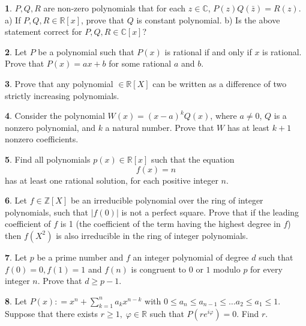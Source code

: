 \documentclass{article}
\theoremstyle{definition}
\newtheorem{p}{}
\begin{document}
\begin{p}
$P,Q,R$ are non-zero polynomials that for each $z\in\mathbb C$, $P(z)Q(\bar z)=R(z)$.
a) If $P,Q,R\in\mathbb R[x]$, prove that $Q$ is constant polynomial.
b) Is the above statement correct for $P,Q,R\in\mathbb C[x]$?
\end{p}



\begin{p}
Let $P$ be a polynomial such that $P(x)$ is rational if and only if $x$ is rational. Prove that $P(x)=ax+b$ for some rational $a$ and $b$.
\end{p}



\begin{p}
Prove that any polynomial $\in \mathbb{R} [X]$ can be written as a difference of two strictly increasing polynomials.
\end{p}



\begin{p}
Consider the polynomial $W(x) = (x - a)^kQ(x)$, where $a \neq 0$, $Q$ is a nonzero polynomial, and $k$ a natural number. Prove that $W$ has at least $k + 1$ nonzero coefficients.
\end{p}



\begin{p}
Find all polynomials $p(x) \in \mathbb{R}[x]$ such that the equation \[f(x) = n\] has at least one rational solution, for each positive integer $n$.
\end{p}



\begin{p}
Let $f\in\mathbb{Z}[X]$ be an irreducible polynomial over the ring  of integer polynomials, such that $|f(0)|$ is not a perfect square. Prove that if the leading coefficient of $f$ is 1 (the coefficient of the term having the highest degree in $f$) then $f(X^2)$ is also irreducible in the ring of integer polynomials.
\end{p}



\begin{p}
Let $ p$ be a prime number and $ f$ an integer polynomial of degree $ d$ such that $ f(0) = 0,f(1) = 1$ and $ f(n)$ is congruent to $ 0$ or $ 1$ modulo $ p$ for every integer $ n$. Prove that $ d\geq p - 1$.
\end{p}



\begin{p}
Let $P(x): =x^{n}+\sum\limits_{k=1}^{n}a_kx^{n-k}$  with $0\le a_n\le a_{n-1}\le\ldots a_2\le a_1\le 1$. Suppose that there exists $r\ge 1 ,\; \varphi \in {\mathbb R}$  such that  $P(re^{i\varphi})=0$. Find $r$.
\end{p}
\end{document}
